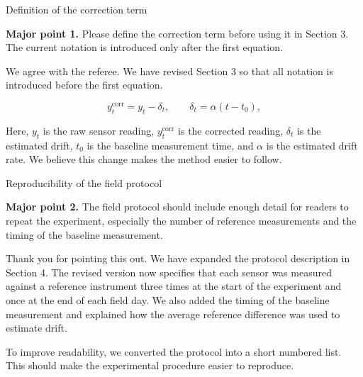 \begin{replypoint}[Revised]{Definition of the correction term}
\begin{refereecomment}
\textbf{Major point 1.} Please define the correction term before using it in Section 3. The current notation is introduced only after the first equation.
\end{refereecomment}

\begin{authorreply}
We agree with the referee. We have revised Section 3 so that all notation is introduced before the first equation.

\begin{replyformula}
\[
  y_t^{\mathrm{corr}} = y_t - \delta_t,
  \qquad
  \delta_t = \alpha(t-t_0),
\]
\end{replyformula}

Here, \(y_t\) is the raw sensor reading, \(y_t^{\mathrm{corr}}\) is the corrected reading, \(\delta_t\) is the estimated drift, \(t_0\) is the baseline measurement time, and \(\alpha\) is the estimated drift rate. We believe this change makes the method easier to follow.

\end{authorreply}
\end{replypoint}

\begin{replypoint}[Revised]{Reproducibility of the field protocol}
\begin{refereecomment}
\textbf{Major point 2.} The field protocol should include enough detail for readers to repeat the experiment, especially the number of reference measurements and the timing of the baseline measurement.
\end{refereecomment}

\begin{authorreply}
Thank you for pointing this out. We have expanded the protocol description in Section 4. The revised version now specifies that each sensor was measured against a reference instrument three times at the start of the experiment and once at the end of each field day. We also added the timing of the baseline measurement and explained how the average reference difference was used to estimate drift.

To improve readability, we converted the protocol into a short numbered list. This should make the experimental procedure easier to reproduce.

\end{authorreply}
\end{replypoint}

